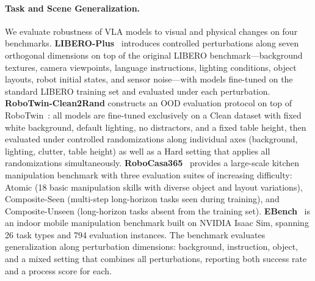 \paragraph{Task and Scene Generalization.}
We evaluate robustness of VLA models to visual and physical changes on four benchmarks.
\textbf{LIBERO-Plus}~\citep{fei2025liberoplus} introduces controlled perturbations along seven orthogonal dimensions on top of the original LIBERO benchmark---background textures, camera viewpoints, language instructions, lighting conditions, object layouts, robot initial states, and sensor noise---with models fine-tuned on the standard LIBERO training set and evaluated under each perturbation.
\textbf{RoboTwin-Clean2Rand} constructs an OOD evaluation protocol on top of RoboTwin~\citep{mu2025robotwin}: all models are fine-tuned exclusively on a Clean dataset with fixed white background, default lighting, no distractors, and a fixed table height, then evaluated under controlled randomizations along individual axes (background, lighting, clutter, table height) as well as a Hard setting that applies all randomizations simultaneously.
\textbf{RoboCasa365}~\citep{nasiriany2026robocasa365} provides a large-scale kitchen manipulation benchmark with three evaluation suites of increasing difficulty: Atomic (18 basic manipulation skills with diverse object and layout variations), Composite-Seen (multi-step long-horizon tasks seen during training), and Composite-Unseen (long-horizon tasks absent from the training set).
\textbf{EBench}~\citep{ebench2026} is an indoor mobile manipulation benchmark built on NVIDIA Isaac Sim, spanning 26 task types and 794 evaluation instances. The benchmark evaluates generalization along perturbation dimensions: background, instruction, object, and a mixed setting that combines all perturbations, reporting both success rate and a process score for each.

